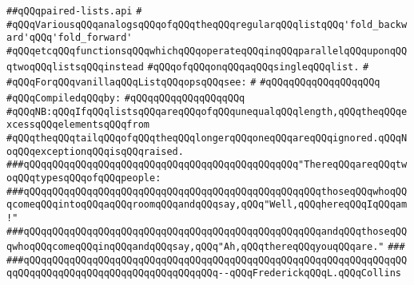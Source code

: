 \label{src/lib/std/src/paired-lists.api}
\verb|##qQQqpaired-lists.api|\newline
\verb|#|\newline
\verb|#qQQqVariousqQQqanalogsqQQqofqQQqtheqQQqregularqQQqlistqQQq'fold_backward'qQQq'fold_forward'|\newline
\verb|#qQQqetcqQQqfunctionsqQQqwhichqQQqoperateqQQqinqQQqparallelqQQquponqQQqtwoqQQqlistsqQQqinstead|\newline
\verb|#qQQqofqQQqonqQQqaqQQqsingleqQQqlist.|\newline
\verb|#|\newline
\verb|#qQQqForqQQqvanillaqQQqListqQQqopsqQQqsee:|\newline
\verb|#|\newline
\verb|#qQQqqQQqqQQqqQQqqQQq|\newline
\newline
\verb|#qQQqCompiledqQQqby:|\newline
\verb|#qQQqqQQqqQQqqQQqqQQq|\newline
\newline
\newline
\verb|#qQQqNB:qQQqIfqQQqlistsqQQqareqQQqofqQQqunequalqQQqlength,qQQqtheqQQqexcessqQQqelementsqQQqfrom|\newline
\verb|#qQQqtheqQQqtailqQQqofqQQqtheqQQqlongerqQQqoneqQQqareqQQqignored.qQQqNoqQQqexceptionqQQqisqQQqraised.|\newline
\newline
\newline
\newline
\verb|###qQQqqQQqqQQqqQQqqQQqqQQqqQQqqQQqqQQqqQQqqQQqqQQq"ThereqQQqareqQQqtwoqQQqtypesqQQqofqQQqpeople:|\newline
\verb|###qQQqqQQqqQQqqQQqqQQqqQQqqQQqqQQqqQQqqQQqqQQqqQQqqQQqthoseqQQqwhoqQQqcomeqQQqintoqQQqaqQQqroomqQQqandqQQqsay,qQQq"Well,qQQqhereqQQqIqQQqam!"|\newline
\verb|###qQQqqQQqqQQqqQQqqQQqqQQqqQQqqQQqqQQqqQQqqQQqqQQqqQQqandqQQqthoseqQQqwhoqQQqcomeqQQqinqQQqandqQQqsay,qQQq"Ah,qQQqthereqQQqyouqQQqare."|\newline
\verb|###|\newline
\verb|###qQQqqQQqqQQqqQQqqQQqqQQqqQQqqQQqqQQqqQQqqQQqqQQqqQQqqQQqqQQqqQQqqQQqqQQqqQQqqQQqqQQqqQQqqQQqqQQqqQQqqQQq--qQQqFrederickqQQqL.qQQqCollins|\newline
\newline
